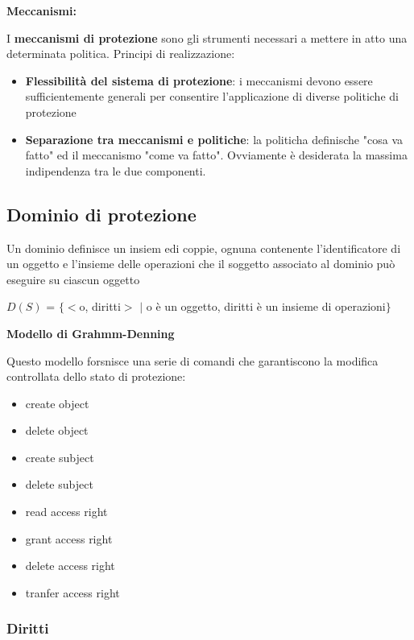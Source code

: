 \documentclass{article}
\begin{document}
\textbf{Meccanismi:}

I \textbf{meccanismi di protezione} sono gli strumenti necessari a mettere in atto una determinata politica.
Principi di realizzazione:
\begin{itemize}
    \item \textbf{Flessibilità del sistema di protezione}: i meccanismi devono essere sufficientemente generali per consentire l'applicazione di diverse politiche 
    di protezione
    \item \textbf{Separazione tra meccanismi e politiche}: la politicha definische "cosa va fatto" ed il meccanismo "come va fatto". Ovviamente è desiderata la
    massima indipendenza tra le due componenti.
\end{itemize}

\subsection{Dominio di protezione}
Un dominio definisce un insiem edi coppie, ognuna contenente l'identificatore di un oggetto e l'insieme delle operazioni che il soggetto associato al
dominio può eseguire su ciascun oggetto

\vspace{3mm}
$D(S)$ = $\{$$<$o, diritti$>$ $|$ o è un oggetto, diritti è un insieme di operazioni$\}$
\vspace{3mm}

\textbf{Modello di Grahmm-Denning}

Questo modello forsnisce una serie di comandi che garantiscono la modifica controllata dello stato di protezione:
\begin{itemize}
    \item create object
    \item delete object
    \item create subject
    \item delete subject
    \item read access right
    \item grant access right
    \item delete access right
    \item tranfer access right
\end{itemize}

\vspace{3mm}
\subsubsection{Diritti}
\end{document}
